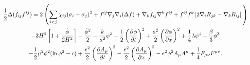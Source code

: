\begin{multline}
    \frac{1}{2} \Delta (f_{ij} f^{ij}) =
    2 \left(\sum_{i<j} \chi_{ij}(\sigma_{i} - \sigma_{j})^{2}
    + f^{ij} \nabla_{j} \nabla_{i} (\Delta f)  + \nabla_{k} f_{ij} \nabla^{k} f^{ij} +
    f^{ij} f^{k} \left[2\nabla_{i}R_{jk}- \nabla_{k} R_{ij} \right] \vphantom{\sum_{i<j}} \right) \\
    - 3H^{2}\left[1+\frac{\dot{\phi}}{2H^2}\right] - \frac{\dot{\phi}^{2}}{2} - \frac{k}{a^{2}}\phi^{2} - \frac{1}{2}\left(\frac{\partial\phi}{\partial t}\right)^{2} + \frac{a^2}{2}\left(\frac{\partial\phi}{\partial x}\right)^{2}
    + \frac{1}{4}\lambda\phi^{4} + \frac{\beta}{3}\phi^{3} \\
    -\frac{1}{2}\mu^{2}\phi^{2}(\ln{\phi^{2}} - c)
    + \frac{e^{2}}{2}\left(\frac{\partial A_{\mu}}{\partial t}\right)^{2} - \frac{e^{2}}{2}\left(\frac{\partial A_{\mu}}{\partial x}\right)^{2}
    - e^{2}\phi^{2}A_{\mu}A^{\mu} + \frac{1}{4}F_{\mu\nu}F^{\mu\nu}.
\end{multline}